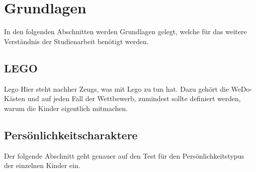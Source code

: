 \chapter{Grundlagen}

In den folgenden Abschnitten werden Grundlagen gelegt, welche für das weitere Verständnis der Studienarbeit benötigt werden.

\section{LEGO}
\gls{Lego}
Hier steht nachher Zeugs, was mit Lego zu tun hat. Dazu gehört die WeDo-Kästen und auf jeden Fall der Wettbewerb, zumindest sollte definiert werden, warum die Kinder eigentlich mitmachen.

\section{Persönlichkeitscharaktere}

Der folgende Abschnitt geht genauer auf den Test für den Persönlichkeitstypus der einzelnen Kinder ein.

